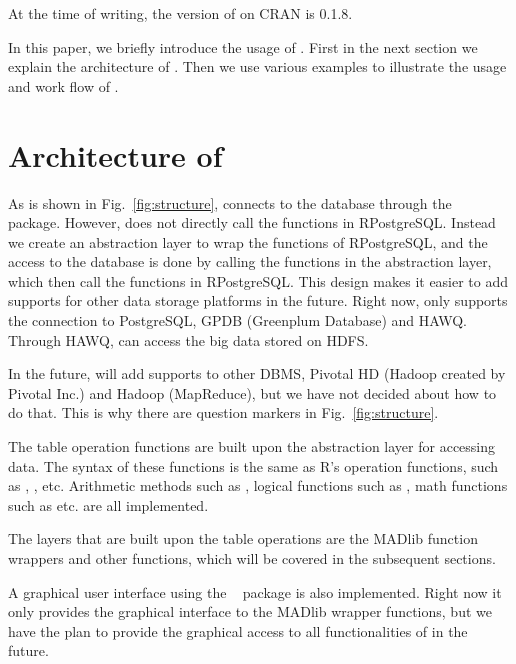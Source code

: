 At the time of writing, the version of  on CRAN is 0.1.8.

In this paper, we briefly introduce the usage of . First
in the next section we explain the architecture of
. Then we use various examples to illustrate the usage
and work flow of .

\section{Architecture of }

As is shown in Fig.~\ref{fig:structure},  connects to
the database through the ~\citep{rpostgresql}
package. However,  does not directly call the functions
in RPostgreSQL. Instead we create an abstraction layer to wrap the
functions of RPostgreSQL, and the access to the database is done by
calling
the functions in the abstraction layer, which then call the functions
in RPostgreSQL. This design makes it easier to add supports for other
data storage platforms in the future. Right now,  only
supports the connection to PostgreSQL, GPDB (Greenplum Database) and
HAWQ. Through HAWQ,  can access the big data stored on
HDFS.

In the future,  will add supports to other DBMS, Pivotal
HD (Hadoop created by Pivotal Inc.)  and Hadoop (MapReduce), but we
have not decided about how to do that. This is why there are question
markers in Fig.~\ref{fig:structure}.

The table operation functions are built upon the abstraction layer for
accessing data. The syntax of these functions is the same as R's
 operation functions, such as \code{[, [<-, \$,
  \$<-}, ,  etc. Arithmetic methods such as
\code{+, -, *, /}, logical functions such as \code{>, <, ==, !=, <=,
  >=, !, |, \&}, math functions such as 
etc. are all implemented.

The layers that are built upon the table operations are the MADlib
function wrappers and
other functions, which will be covered in the subsequent sections.

A graphical user interface using the ~\citep{shiny}
package is also implemented. Right now it only provides the graphical
interface to the MADlib wrapper functions, but we have the plan to
provide the
graphical access to all functionalities of  in the
future.

